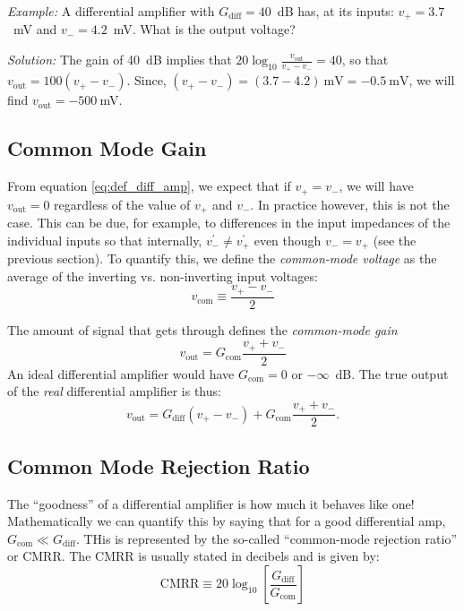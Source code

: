 \documentclass{tufte-book}
\begin{document}
\textit{Example:} A differential amplifier with $G_\text{diff} = 40$~dB has, at its inputs: $v_+ = 3.7$~mV and $v_- = 4.2$~mV. What is the output voltage?

\textit{Solution:} The gain of 40~dB implies that $20\log_{10}\frac{v_\text{out}}{v_+-v_-} = 40$, so that $v_\text{out} = 100\left(v_+-v_-\right)$. Since, $\left(v_+-v_-\right) = \left(3.7-4.2\right)~\text{mV} = -0.5~\text{mV}$, we will find $v_\text{out} = -500~$mV.
\subsection{Common Mode Gain}
From equation \ref{eq:def_diff_amp}, we expect that if $v_+ = v_-$, we will have $v_\text{out} = 0$ regardless of the value of $v_+$ and $v_-$. In practice however, this is not the case. This can be due, for example, to differences in the input impedances of the individual inputs so that internally, $v_-^\prime \neq v_+^\prime$ even though $v_- = v_+$ (see the previous section). To quantify this, we define the \textit{common-mode voltage} as the average of the inverting vs. non-inverting input voltages:
\begin{equation}
\label{eq:common_mode_voltage}
v_\text{com} \equiv \frac{v_+-v_-}{2}
\end{equation}

The amount of signal that gets through defines the \textit{common-mode gain}
\begin{equation}
\label{eq:common_mode_gain}
v_\text{out} = G_\text{com}\frac{v_++v_-}{2}
\end{equation}
An ideal differential amplifier would have $G_\text{com} = 0$ or $-\infty$~dB. The true output of the \textit{real} differential amplifier is thus:
\begin{equation}
\label{eq:real_diff_amp}
v_\text{out} = G_\text{diff}\left(v_+-v_-\right) + G_\text{com}\frac{v_++v_-}{2}.
\end{equation}

\subsection{Common Mode Rejection Ratio}
The ``goodness'' of a differential amplifier is how much it behaves like one! Mathematically we can quantify this by saying that for a good differential amp, $G_\text{com} \ll G_\text{diff}$. THis is represented by the so-called ``common-mode rejection ratio'' or CMRR. The CMRR is usually stated in decibels and is given by:
\begin{equation}
\label{eq:def_CMRR}
\text{CMRR} \equiv 20\log_{10}\left[\frac{G_\text{diff}}{G_\text{com}}\right]
\end{equation}
 
\end{document}
